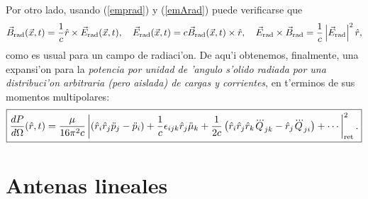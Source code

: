 Por otro lado, usando (\ref{emprad}) y (\ref{emArad}) puede verificarse que
\begin{equation}
 \vec{B}_{\rm rad}(\vec{x},t)=\frac{1}{c}\hat{r}\times\vec{E}_{\rm rad}(\vec{x},t), \quad  \vec{E}_{\rm rad}(\vec{x},t)=c\vec{B}_{\rm rad}(\vec{x},t)\times\hat{r}, \quad \vec{E}_{\rm rad}\times\vec{B}_{\rm rad}=\frac{1}{c}\left|\vec{E}_{\rm rad}\right|^2\hat{r},
\end{equation}
como es usual para un campo de radiaci'on. De aqu'i obtenemos, finalmente, una expansi'on para la \textit{potencia por unidad de 'angulo s'olido radiada por una distribuci'on arbitraria (pero aislada) de cargas y corrientes}, en t'erminos de sus momentos multipolares:
\begin{equation}
 \boxed{\frac{dP}{d\Omega}(\hat{r},t)=\frac{\mu}{16\pi^2c} \left|\left(\hat{r}_i\hat{r}_j\ddot{p}_j-\ddot{p}_i\right)+\frac{1}{c}\epsilon_{ijk}\hat{r}_j\ddot{\mu}_k+\frac{1}{2c}\left(\hat{r}_i\hat{r}_j\hat{r}_k\dddot{Q}_{jk}-\hat{r}_j\dddot{Q}_{ji} \right)+\cdots\right|^2_{\rm ret}.}
\end{equation}


\section{Antenas lineales}


